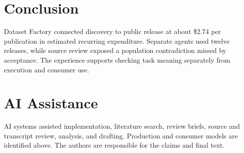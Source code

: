\documentclass[conference,10pt,letterpaper]{IEEEtran}
\begin{document}
\section{Conclusion}
Dataset Factory connected discovery to public release at about \$2.74 per publication in estimated recurring expenditure. Separate agents used twelve releases, while source review exposed a population contradiction missed by acceptance. The experience supports checking task meaning separately from execution and consumer use.

\section*{AI Assistance}
AI systems assisted implementation, literature search, review briefs, source and transcript review, analysis, and drafting. Production and consumer models are identified above. The authors are responsible for the claims and final text.



\end{document}
